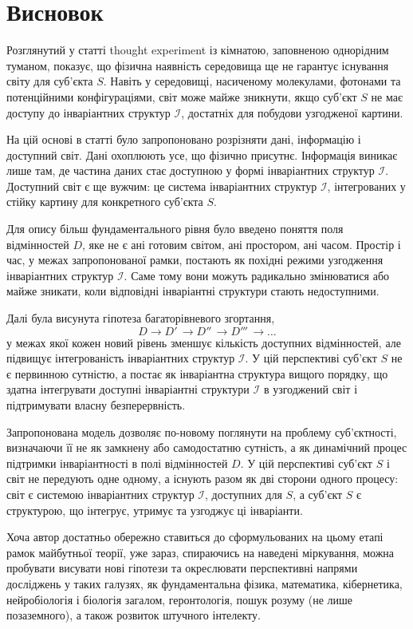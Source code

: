 \documentclass[aps,prd,onecolumn,nofootinbib,superscriptaddress]{revtex4-2} %
\begin{document}
    \section{Висновок}

    Розглянутий у статті thought experiment із кімнатою, заповненою однорідним туманом, показує, що фізична наявність середовища ще не гарантує існування світу для суб’єкта \(S\). Навіть у середовищі, насиченому молекулами, фотонами та потенційними конфігураціями, світ може майже зникнути, якщо суб’єкт \(S\) не має доступу до інваріантних структур \(\mathcal{I}\), достатніх для побудови узгодженої картини.

    На цій основі в статті було запропоновано розрізняти дані, інформацію і доступний світ. Дані охоплюють усе, що фізично присутнє. Інформація виникає лише там, де частина даних стає доступною у формі інваріантних структур \(\mathcal{I}\). Доступний світ є ще вужчим: це система інваріантних структур \(\mathcal{I}\), інтегрованих у стійку картину для конкретного суб’єкта \(S\).

    Для опису більш фундаментального рівня було введено поняття поля відмінностей \(D\), яке не є ані готовим світом, ані простором, ані часом. Простір і час, у межах запропонованої рамки, постають як похідні режими узгодження інваріантних структур \(\mathcal{I}\). Саме тому вони можуть радикально змінюватися або майже зникати, коли відповідні інваріантні структури стають недоступними.

    Далі була висунута гіпотеза багаторівневого згортання,
    \[ D \to D'\, \to D''\, \to D'''\, \to \dots \]
    у межах якої кожен новий рівень зменшує кількість доступних відмінностей, але підвищує інтегрованість інваріантних структур \(\mathcal{I}\). У цій перспективі суб’єкт \(S\) не є первинною сутністю, а постає як інваріантна структура вищого порядку, що здатна інтегрувати доступні інваріантні структури \(\mathcal{I}\) в узгоджений світ і підтримувати власну безперервність.

    Запропонована модель дозволяє по-новому поглянути на проблему суб’єктності, визначаючи її не як замкнену або самодостатню сутність, а як динамічний процес підтримки інваріантності в полі відмінностей \(D\). У цій перспективі суб’єкт \(S\) і світ не передують одне одному, а існують разом як дві сторони одного процесу: світ є системою інваріантних структур \(\mathcal{I}\), доступних для \(S\), а суб’єкт \(S\) є структурою, що інтегрує, утримує та узгоджує ці інваріанти.

    Хоча автор достатньо обережно ставиться до сформульованих на цьому етапі рамок майбутньої теорії, уже зараз, спираючись на наведені міркування, можна пробувати висувати нові гіпотези та окреслювати перспективні напрями досліджень у таких галузях, як фундаментальна фізика, математика, кібернетика, нейробіологія і біологія загалом, геронтологія, пошук розуму (не лише позаземного), а також розвиток штучного інтелекту.
\end{document}
